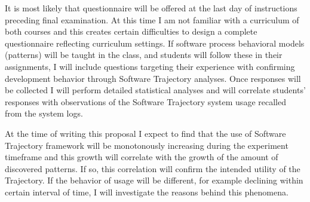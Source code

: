 It is most likely that questionnaire will be offered at the last day of instructions preceding final examination. At this time I am not familiar with a curriculum of both courses and this creates certain difficulties to design a complete questionnaire reflecting curriculum settings. If software process behavioral models (patterns) will be taught in the class, and students will follow these in their assignments, I will include questions targeting their experience with confirming development behavior through Software Trajectory analyses. Once responses will be collected I will perform detailed statistical analyses and will correlate students' responses with observations of the Software Trajectory system usage recalled from the system logs. 

At the time of writing this proposal I expect to find that the use of Software Trajectory framework will be monotonously increasing during the experiment timeframe and this growth will correlate with the growth of the amount of discovered patterns. If so, this correlation will confirm the intended utility of the Trajectory. If the behavior of usage will be different, for example declining within certain interval of time, I will investigate the reasons behind this phenomena.
